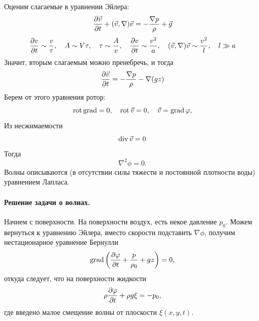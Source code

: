 Оценим слагаемые в уравнении Эйлера:
\begin{gather}
	\label{eq}
	\pdv{\vec{v}}{t}+(\vec{v},\nabla)\vec{v}=-\frac{\nabla p}{\rho}+\vec{g}
\end{gather}
\begin{gather}
	\label{eq}
	\pdv{v}{t}\sim\frac{v}{\tau}, \quad 
	A\sim V\tau, \quad \tau \sim \frac{A}{v},
	\quad \pdv{v}{t}\sim \frac{v^2}{a}, 
	\quad (\vec{v},\nabla)\vec{v}\sim \frac{v^2}{l},
	\quad l\gg a
\end{gather}
Значит, вторым слагаемым можно пренебречь, и тогда
\begin{gather}
	\label{eq}
	\pdv{\vec{v}}{t}=-\frac{\nabla p}{\rho}-\nabla(gz)
\end{gather}
Берем от этого уравнения ротор:
\begin{equation}
	\operatorname{rot}\operatorname{grad}=0, \quad
	\operatorname{rot}\vec{v}=0, \quad \vec{v}=\operatorname{grad}\varphi,
\end{equation}
Из несжимаемости
\begin{equation}
	\operatorname{div}\vec{v}=0
\end{equation}
Тогда
\begin{equation}
	\nabla^2\phi=0.
\end{equation}
Волны описываются (в отсутствии силы тяжести и постоянной плотности воды) уравнением Лапласа. 

\paragraph{Решение задачи о волнах.} Начнем с поверхности. На поверхности воздух, есть некое давление $p_0$. Можем вернуться к уравнению Эйлера, вместо скорости подставить $\nabla\phi$, получим нестационарное уравнение Бернулли
\begin{equation}
	\operatorname{grad}\qty(\pdv{\varphi}{t}+\frac{p}{\rho_0}+gz)=0,
\end{equation}
откуда следует, что на поверхности жидкости
\begin{equation}
	\rho\pdv{\varphi}{t}+\rho g\xi=-p_0,
\end{equation}
где введено малое смещение волны от плоскости $\xi(x,y,t)$.

